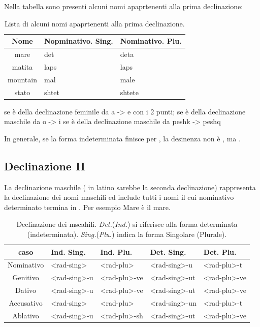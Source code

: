 Nella tabella  sono presenti alcuni nomi apaprtenenti alla prima declinazione:

\begin{table}[H]
    \centering
    \begin{tabular}{cll}
        \toprule
        Nome        & Nopminativo. Sing.    & Nominativo. Plu.\\
        \midrule
        mare        & det                   & deta \\
        matita      & laps                  & laps \\
        mountain    & mal                   & male \\
        stato       & shtet                 & shtete \\    
        \bottomrule
    \end{tabular}
    \caption{Lista di alcuni nomi apaprtenenti alla prima declinazione.}
    \label{decl:1:lista}
\end{table}

se è della declinazione feminile da a -> e con i 2 punti;
se è della declinazione maschile da o -> i
se è della declinazione maschile da peshk -> peshq


In generale, se la forma indeterminata finisce per , la desinenza non è , ma .

\subsection{Declinazione II}

La declinazione maschile (\ie{} in latino sarebbe la seconda declinazione) rappresenta la declinazione dei nomi maschili ed include tutti i nomi il cui nominativo determinato termina in . Per esempio \glsdesc{Mare} è il mare.

\begin{table}[H]
    \centering
    \begin{tabular}{cllll}
        \toprule
        caso        & Ind. Sing.         & Ind. Plu.        & Det. Sing.      & Det. Plu. \\
        \midrule
        Nominativo  & <rad-sing>         & <rad-plu>        & <rad-sing>-u    & <rad-plu>-t  \\
        Genitivo    & <rad-sing>-u       & <rad-plu>-ve     & <rad-sing>-ut   & <rad-plu>-ve \\
        Dativo      & <rad-sing>-u       & <rad-plu>-ve     & <rad-sing>-ut   & <rad-plu>-ve \\
        Accusativo  & <rad-sing>         & <rad-plu>        & <rad-sing>-un   & <rad-plu>-t \\
        Ablativo    & <rad-sing>-u       & <rad-plu>-sh     & <rad-sing>-ut   & <rad-plu>-ve \\
        \bottomrule
    \end{tabular}
    \caption{Declinazione dei mscahili. \textit{Det.}(\textit{Ind.}) si riferisce alla forma determinata (indeterminata). \textit{Sing.}(\textit{Plu.}) indica la forma Singolare (Plurale).}
\end{table}

